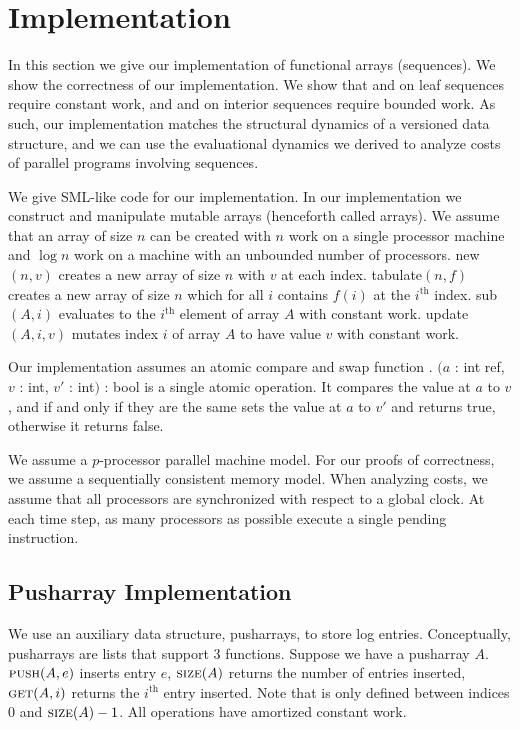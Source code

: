 \section{Implementation}
\label{sec:implementations}

In this section we give our implementation of functional arrays (sequences). We show the correctness of our implementation. We show that \get{} and \set{} on leaf sequences require constant work, and \get{} and \set{} on interior sequences require bounded work. As such, our implementation matches the structural dynamics of a versioned data structure, and we can use the evaluational dynamics we derived to analyze costs of parallel programs involving sequences.

We give SML-like code for our implementation. In our implementation we construct and manipulate mutable arrays (henceforth called arrays). We assume that an array of size $n$ can be created with $n$ work on a single processor machine and $\log{n}$ work on a machine with an unbounded number of processors. new$(n, v)$ creates a new array of size $n$ with $v$ at each index. tabulate$(n, f)$ creates a new array of size $n$ which for all $i$ contains $f(i)$ at the $i^{\text{th}}$ index. sub$(A,i)$ evaluates to the $i^{\text{th}}$ element of array $A$ with constant work. update$(A, i, v)$ mutates index $i$ of array $A$ to have value $v$ with constant work.

Our implementation assumes an atomic compare and swap function . $(a$ : int ref, $v$ : int, $v'$ : int$)$ : bool is a single atomic operation. It compares the value at $a$ to $v$, and if and only if they are the same sets the value at $a$ to $v'$ and returns true, otherwise it returns false.

We assume a $p$-processor parallel machine model. For our proofs of correctness, we assume a sequentially consistent memory model. When analyzing costs, we assume that all processors are synchronized with respect to a global clock. At each time step, as many processors as possible execute a single pending instruction.

\subsection{Pusharray Implementation}

We use an auxiliary data structure, pusharrays, to store log entries. Conceptually, pusharrays are lists that support 3 functions. Suppose we have a pusharray $A$. $\text{{\sc push}}{}(A,e)$ inserts entry $e$, $\text{{\sc size}}{}(A)$ returns the number of entries inserted, $\text{{\sc get}}(A,i)$ returns the $i^{\text{th}}$ entry inserted. Note that \get{} is only defined between indices 0 and $\text{{\sc size}}{}(A)-1$. All operations have amortized constant work.


